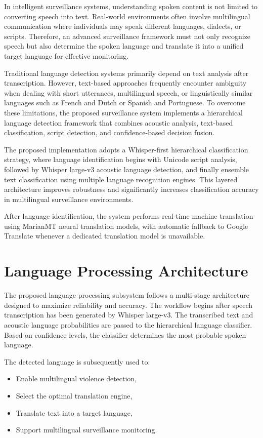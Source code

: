 \documentclass[12pt]{report}
\begin{document}
In intelligent surveillance systems, understanding spoken content is not limited to converting speech into text. Real-world environments often involve multilingual communication where individuals may speak different languages, dialects, or scripts. Therefore, an advanced surveillance framework must not only recognize speech but also determine the spoken language and translate it into a unified target language for effective monitoring.

Traditional language detection systems primarily depend on text analysis after transcription. However, text-based approaches frequently encounter ambiguity when dealing with short utterances, multilingual speech, or linguistically similar languages such as French and Dutch or Spanish and Portuguese. To overcome these limitations, the proposed surveillance system implements a hierarchical language detection framework that combines acoustic analysis, text-based classification, script detection, and confidence-based decision fusion.

The proposed implementation adopts a Whisper-first hierarchical classification strategy, where language identification begins with Unicode script analysis, followed by Whisper large-v3 acoustic language detection, and finally ensemble text classification using multiple language recognition engines. This layered architecture improves robustness and significantly increases classification accuracy in multilingual surveillance environments.

After language identification, the system performs real-time machine translation using MarianMT neural translation models, with automatic fallback to Google Translate whenever a dedicated translation model is unavailable.

\section{Language Processing Architecture}

The proposed language processing subsystem follows a multi-stage architecture designed to maximize reliability and accuracy. The workflow begins after speech transcription has been generated by Whisper large-v3. The transcribed text and acoustic language probabilities are passed to the hierarchical language classifier. Based on confidence levels, the classifier determines the most probable spoken language.

The detected language is subsequently used to:
\begin{itemize}
    \item Enable multilingual violence detection,
    \item Select the optimal translation engine,
    \item Translate text into a target language,
    \item Support multilingual surveillance monitoring.
\end{itemize}
\end{document}
